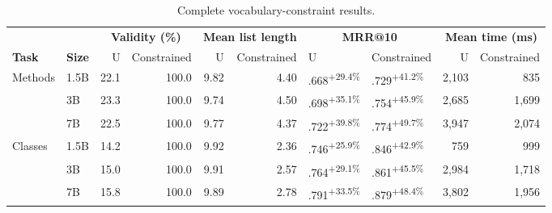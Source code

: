 \begin{table}[t]
\centering
\caption{Complete vocabulary-constraint results.}
\label{tab:vocabulary-constraints}
\setlength{\tabcolsep}{3.5pt}
\small
\begin{adjustbox}{max width=\textwidth}
\begin{tabular}{llrr@{\hspace{10pt}}rr@{\hspace{10pt}}ll@{\hspace{10pt}}rr}
\toprule
 & & \multicolumn{2}{c}{\textbf{Validity (\%)}} & \multicolumn{2}{c}{\textbf{Mean list length}} & \multicolumn{2}{c}{\textbf{MRR@10}} & \multicolumn{2}{c}{\textbf{Mean time (ms)}} \\
\cmidrule(lr){3-4}\cmidrule(lr){5-6}\cmidrule(lr){7-8}\cmidrule(lr){9-10}
\textbf{Task} & \textbf{Size} & U & Constrained & U & Constrained & U & Constrained & U & Constrained \\
\midrule
Methods & 1.5B & 22.1 & 100.0 & 9.82 & 4.40 & .668\textsuperscript{$+$29.4\%} & .729\textsuperscript{$+$41.2\%} & 2{,}103 & 835 \\
 & 3B & 23.3 & 100.0 & 9.74 & 4.50 & .698\textsuperscript{$+$35.1\%} & .754\textsuperscript{$+$45.9\%} & 2{,}685 & 1{,}699 \\
 & 7B & 22.5 & 100.0 & 9.77 & 4.37 & .722\textsuperscript{$+$39.8\%} & .774\textsuperscript{$+$49.7\%} & 3{,}947 & 2{,}074 \\
\midrule
Classes & 1.5B & 14.2 & 100.0 & 9.92 & 2.36 & .746\textsuperscript{$+$25.9\%} & .846\textsuperscript{$+$42.9\%} & 759 & 999 \\
 & 3B & 15.0 & 100.0 & 9.91 & 2.57 & .764\textsuperscript{$+$29.1\%} & .861\textsuperscript{$+$45.5\%} & 2{,}984 & 1{,}718 \\
 & 7B & 15.8 & 100.0 & 9.89 & 2.78 & .791\textsuperscript{$+$33.5\%} & .879\textsuperscript{$+$48.4\%} & 3{,}802 & 1{,}956 \\
\bottomrule
\end{tabular}
\end{adjustbox}
\end{table}
\fi
